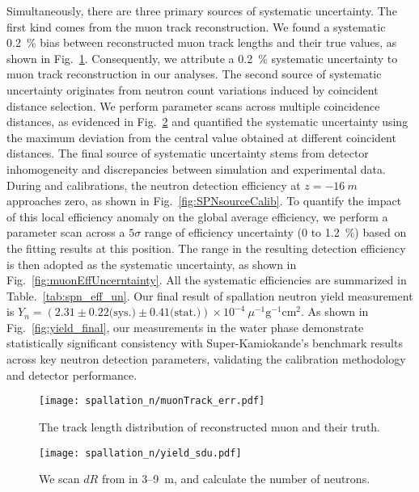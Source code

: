 Simultaneously, there are three primary sources of systematic uncertainty. The first kind comes from the muon track reconstruction. We found a systematic \SI{0.2}{\%} bias between reconstructed muon track lengths and their true values, as shown in Fig.~\ref{fig:muontrackUncerntainty}. Consequently, we attribute a \SI{0.2}{\%} systematic uncertainty to muon track reconstruction in our analyses.
The second source of systematic uncertainty originates from neutron count variations induced by coincident distance selection. We perform parameter scans across multiple coincidence distances, as evidenced in Fig.~\ref{fig:muonCountUncerntainty} and quantified the systematic uncertainty using the maximum deviation from the central value obtained at different coincident distances.
The final source of systematic uncertainty stems from detector inhomogeneity and discrepancies between simulation and experimental data. During  and  calibrations, the neutron detection efficiency at $z = \SI{-16}{m}$ approaches zero, as shown in Fig.~\ref{fig:SPNsourceCalib}. To quantify the impact of this local efficiency anomaly on the global average efficiency, we perform a parameter scan across a $5\sigma$ range of efficiency uncertainty (0 to \SI{1.2}{\%}) based on the fitting results at this position. The range in the resulting detection efficiency is then adopted as the systematic uncertainty, as shown in Fig.~\ref{fig:muonEffUncerntainty}. All the systematic efficiencies are summarized in Table.~\ref{tab:spn_eff_un}. Our final result of spallation neutron yield measurement is $Y_n = (2.31\pm0.22\text{(sys.)}\pm0.41 \text{(stat.)}) \times 10^{-4}~\mu^{-1}\text{g}^{-1}\text{cm}^2$. As shown in Fig.~\ref{fig:yield_final}, our measurements in the water phase demonstrate statistically significant consistency with Super-Kamiokande's benchmark results across key neutron detection parameters, validating the calibration methodology and detector performance.
\begin{figure}[htbp]
	\centering
	\texttt{[image: spallation\_n/muonTrack\_err.pdf]}
	\caption{The track length distribution of reconstructed muon and their truth.}
	\label{fig:muontrackUncerntainty}
\end{figure}

\begin{figure}[htbp]
	\centering
	\texttt{[image: spallation\_n/yield\_sdu.pdf]}
	\caption{We scan $dR$ from in 3--\SI{9}{m}, and calculate the number of neutrons.}
	\label{fig:muonCountUncerntainty}
\end{figure}

